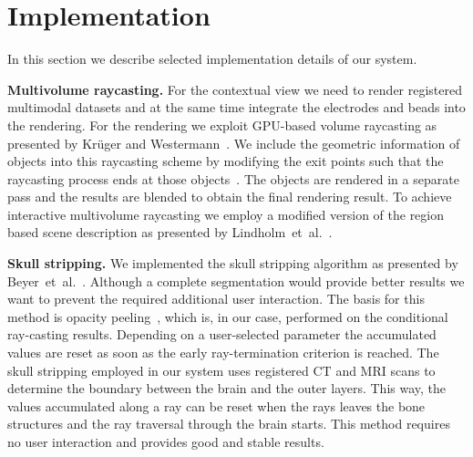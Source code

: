 \documentclass[review]{vgtc}                 %
\begin{document}
\section{Implementation}\label{sec:implementation}
In this section we describe selected implementation details of our system.

\noindent \textbf{Multivolume raycasting.} For the contextual view we need to render registered multimodal datasets and at the same time integrate the electrodes and beads into the rendering. For the rendering we exploit GPU-based volume raycasting as presented by Kr\"uger and Westermann~\cite{kr}. We include the geometric information of objects into this raycasting scheme by modifying the exit points such that the raycasting process ends at those objects~\cite{Scharsach}. The objects are rendered in a separate pass and the results are blended to obtain the final rendering result. To achieve interactive multivolume raycasting we employ a modified version of the region based scene description as presented by Lindholm~et~al.~\cite{Lindholm2009}.

\noindent \textbf{Skull stripping.} We implemented the skull stripping algorithm as presented by Beyer~et~al.~\cite{Beyer2007}. Although a complete segmentation would provide better results we want to prevent the required additional user interaction. The basis for this method is opacity peeling~\cite{Rezk-salama2006}, which is, in our case, performed on the conditional ray-casting results. Depending on a user-selected parameter the accumulated values are reset as soon as the early ray-termination criterion is reached. The skull stripping employed in our system uses registered CT and MRI scans to determine the boundary between the brain and the outer layers. This way, the values accumulated along a ray can be reset when the rays leaves the bone structures and the ray traversal through the brain starts. This method requires no user interaction and provides good and stable results.

\end{document}

